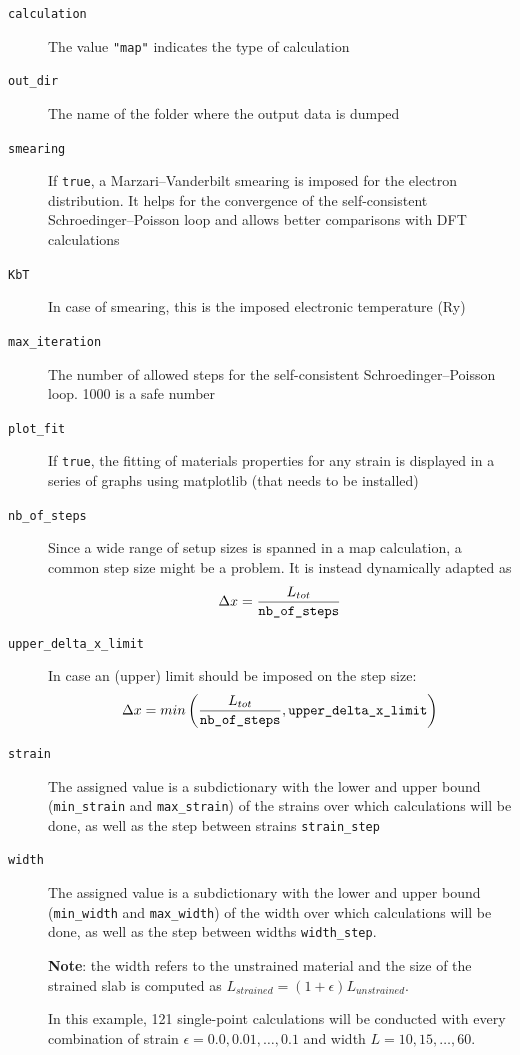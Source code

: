 \documentclass[a4paper,12pt]{article}
\begin{document}
\begin{description}
\item[\texttt{calculation}] The value \texttt{"map"} indicates the type of calculation

\item[\texttt{out\_dir}] The name of the folder where the output data is dumped

\item[\texttt{smearing}] If \texttt{true}, a Marzari--Vanderbilt smearing is imposed for the electron distribution. It helps for the convergence of the self-consistent Schroedinger--Poisson loop and allows better comparisons with DFT calculations

\item[\texttt{KbT}] In case of smearing, this is the imposed electronic temperature (Ry)

\item[\texttt{max\_iteration}] The number of allowed steps for the self-consistent Schroedinger--Poisson loop. 1000 is a safe number

\item[\texttt{plot\_fit}] If \texttt{true}, the fitting of materials properties for any strain is displayed in a series of graphs using matplotlib (that needs to be installed)

\item[\texttt{nb\_of\_steps}] Since a wide range of setup sizes is spanned in a map calculation, a common step size might be a problem. It is instead dynamically adapted as
$$\Delta x = \frac{L_{tot}}{\text{\texttt{nb\_of\_steps}}}$$

\item[\texttt{upper\_delta\_x\_limit}] In case an (upper) limit should be imposed on the step size: 
$$\Delta x = min\left(\frac{L_{tot}}{\text{\texttt{nb\_of\_steps}}}, 
\text{\texttt{upper\_delta\_x\_limit}}\right)$$

\item[\texttt{strain}] The assigned value is a subdictionary with the lower and upper bound (\texttt{min\_strain} and \texttt{max\_strain}) of the strains over which calculations will be done, as well as the step between strains \texttt{strain\_step}

\item[\texttt{width}] The assigned value is a subdictionary with the lower and upper bound (\texttt{min\_width} and \texttt{max\_width}) of the width over which calculations will be done, as well as the step between widths \texttt{width\_step}. 

\textbf{Note}: the width refers to the unstrained material and the size of the strained slab is computed as $L_{strained} = (1+\epsilon)L_{unstrained}$. 

In this example, 121 single-point calculations will be conducted with every combination of strain $\epsilon = 0.0, 0.01,\ldots,0.1$ and width $L = 10, 15,\ldots, 60$.

\end{description}
\end{document}
